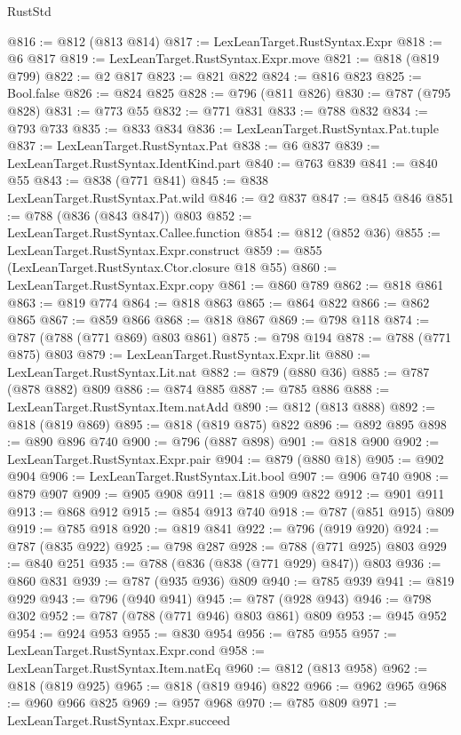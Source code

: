\begin{lexlean}{RustStd}
\begin{coremodule}
@816 := @812 (@813 @814)
@817 := LexLeanTarget.RustSyntax.Expr
@818 := @6 @817
@819 := LexLeanTarget.RustSyntax.Expr.move
@821 := @818 (@819 @799)
@822 := @2 @817
@823 := @821 @822
@824 := @816 @823
@825 := Bool.false
@826 := @824 @825
@828 := @796 (@811 @826)
@830 := @787 (@795 @828)
@831 := @773 @55
@832 := @771 @831
@833 := @788 @832
@834 := @793 @733
@835 := @833 @834
@836 := LexLeanTarget.RustSyntax.Pat.tuple
@837 := LexLeanTarget.RustSyntax.Pat
@838 := @6 @837
@839 := LexLeanTarget.RustSyntax.IdentKind.part
@840 := @763 @839
@841 := @840 @55
@843 := @838 (@771 @841)
@845 := @838 LexLeanTarget.RustSyntax.Pat.wild
@846 := @2 @837
@847 := @845 @846
@851 := @788 (@836 (@843 @847)) @803
@852 := LexLeanTarget.RustSyntax.Callee.function
@854 := @812 (@852 @36)
@855 := LexLeanTarget.RustSyntax.Expr.construct
@859 := @855 (LexLeanTarget.RustSyntax.Ctor.closure @18 @55)
@860 := LexLeanTarget.RustSyntax.Expr.copy
@861 := @860 @789
@862 := @818 @861
@863 := @819 @774
@864 := @818 @863
@865 := @864 @822
@866 := @862 @865
@867 := @859 @866
@868 := @818 @867
@869 := @798 @118
@874 := @787 (@788 (@771 @869) @803 @861)
@875 := @798 @194
@878 := @788 (@771 @875) @803
@879 := LexLeanTarget.RustSyntax.Expr.lit
@880 := LexLeanTarget.RustSyntax.Lit.nat
@882 := @879 (@880 @36)
@885 := @787 (@878 @882) @809
@886 := @874 @885
@887 := @785 @886
@888 := LexLeanTarget.RustSyntax.Item.natAdd
@890 := @812 (@813 @888)
@892 := @818 (@819 @869)
@895 := @818 (@819 @875) @822
@896 := @892 @895
@898 := @890 @896 @740
@900 := @796 (@887 @898)
@901 := @818 @900
@902 := LexLeanTarget.RustSyntax.Expr.pair
@904 := @879 (@880 @18)
@905 := @902 @904
@906 := LexLeanTarget.RustSyntax.Lit.bool
@907 := @906 @740
@908 := @879 @907
@909 := @905 @908
@911 := @818 @909 @822
@912 := @901 @911
@913 := @868 @912
@915 := @854 @913 @740
@918 := @787 (@851 @915) @809
@919 := @785 @918
@920 := @819 @841
@922 := @796 (@919 @920)
@924 := @787 (@835 @922)
@925 := @798 @287
@928 := @788 (@771 @925) @803
@929 := @840 @251
@935 := @788 (@836 (@838 (@771 @929) @847)) @803
@936 := @860 @831
@939 := @787 (@935 @936) @809
@940 := @785 @939
@941 := @819 @929
@943 := @796 (@940 @941)
@945 := @787 (@928 @943)
@946 := @798 @302
@952 := @787 (@788 (@771 @946) @803 @861) @809
@953 := @945 @952
@954 := @924 @953
@955 := @830 @954
@956 := @785 @955
@957 := LexLeanTarget.RustSyntax.Expr.cond
@958 := LexLeanTarget.RustSyntax.Item.natEq
@960 := @812 (@813 @958)
@962 := @818 (@819 @925)
@965 := @818 (@819 @946) @822
@966 := @962 @965
@968 := @960 @966 @825
@969 := @957 @968
@970 := @785 @809
@971 := LexLeanTarget.RustSyntax.Expr.succeed

\end{coremodule}
\end{lexlean}
